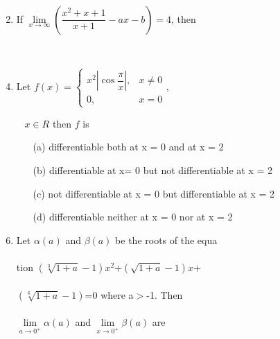 \begin{enumerate}[label=\arabic*.,ref=\thesubsection.\theenumi]
\item[~] \item If $\lim\limits_{x \to \infty}\left(\dfrac{x^2+x+1}{x+1}-ax-b\right)=4$, then
\begin{itemize}
\end{itemize} 

\item[~] \item Let $f(x)=\begin{cases}
x^2\left|\cos\dfrac{\pi}{x}\right|, & \text{$x\ne 0$}\\
0, & \text{$x=0$}
\end{cases}$, \\ \item[~]$x \in R$ then $f$ is
\begin{itemize}
\item[(a)] differentiable both at x = 0 and at x = 2
\item[(b)] differentiable at x= 0 but not differentiable at x = 2
\item[(c)] not differentiable at x = 0 but differentiable at x = 2
\item[(d)] differentiable neither at x = 0 nor at x = 2
\end{itemize}

\item Let $\alpha(a)$ and $\beta(a)$ be the roots of the equa\\ \\tion
$\left(\sqrt[3]{1+a}-1\right)x^2$+$\left(\sqrt{1+a}-1\right)x$+\\ \\$\left(\sqrt[6]{1+a}-1\right)$=0
 where a$>$-1. Then \\ \\$\lim\limits_{a \to 0^+}\alpha(a)$ and $\lim\limits_{x \to 0^+}\beta(a)$ are
\begin{itemize}
\end{itemize} 


\end{enumerate}
